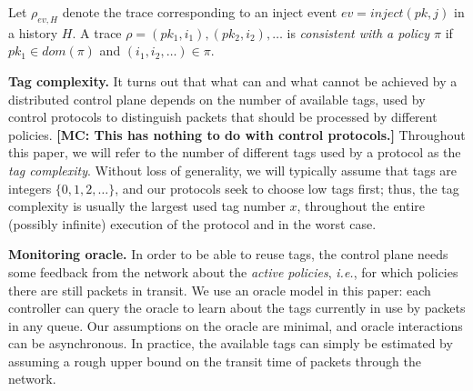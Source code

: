 \documentclass[11pt,pdftex,letter]{article}
\newcommand{\dom}{\textit{dom}}
\newcommand{\ie}{{\it i.e.}}
\newcommand{\mcnote}[1]{\textcolor{heraldBlue}{\small \bf [MC: #1]}}
\newcommand{\mcnote}[1]{}
\begin{document}
Let $\rho_{ev,H}$
denote the trace corresponding
to an inject event $ev=\textit{inject}(pk,j)$ in a history $H$.  %
%
A trace $\rho=(pk_1,i_1),(pk_2,i_2),\ldots$ is
\emph{consistent with a policy $\pi$} if
$pk_1\in \dom(\pi)$ and $(i_1,i_2,\ldots) \in \pi$.


\vspace{1mm}\noindent\textbf{Tag complexity.} It turns out that what can and what cannot be achieved
by a distributed control plane depends on the number of available tags,
used by control protocols to distinguish packets that should be processed by different policies.
\mcnote{This has nothing to do with control protocols.}
Throughout this
paper, we will refer to the number of different tags used by a protocol as the
\emph{tag complexity}. Without loss of generality, we will typically assume that tags are integers $\{0,1,2,\ldots\}$,
and our protocols seek to choose low tags first; thus, the tag complexity is usually the largest
used tag number $x$, throughout the entire (possibly infinite) execution of the protocol and in the
worst case. 


\vspace{1mm}\noindent\textbf{Monitoring oracle.} In order to be able to reuse tags, the control plane needs some feedback
from the network about the \emph{active policies}, \ie, for which policies there are still packets in transit.
We use an oracle model in this paper: each controller can query the oracle to learn about the tags currently
in use by packets in any queue. Our assumptions on the oracle are minimal, and oracle interactions can be asynchronous.
In practice, the available tags can simply be estimated by assuming a rough upper bound on the transit time of
packets through the network.


\end{document}
